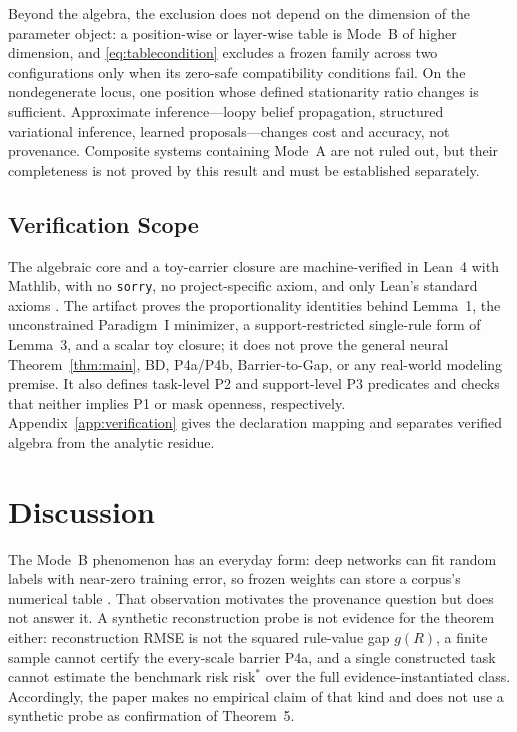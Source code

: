 \documentclass[twoside,11pt]{article}
\begin{document}
Beyond the algebra, the exclusion does not depend on the dimension of the parameter object: a position-wise or layer-wise table is Mode~B of higher dimension, and \eqref{eq:tablecondition} excludes a frozen family across two configurations only when its zero-safe compatibility conditions fail. On the nondegenerate locus, one position whose defined stationarity ratio changes is sufficient. Approximate inference---loopy belief propagation, structured variational inference, learned proposals---changes cost and accuracy, not provenance. Composite systems containing Mode~A are not ruled out, but their completeness is not proved by this result and must be established separately.

\subsection{Verification Scope}
\label{sec:verification}

The algebraic core and a toy-carrier closure are machine-verified in Lean~4 with Mathlib, with no \texttt{sorry}, no project-specific axiom, and only Lean's standard axioms \citep{demoura2021,mathlib2020}. The artifact proves the proportionality identities behind Lemma~1, the unconstrained Paradigm~I minimizer, a support-restricted single-rule form of Lemma~3, and a scalar toy closure; it does not prove the general neural Theorem~\ref{thm:main}, BD, P4a/P4b, Barrier-to-Gap, or any real-world modeling premise. It also defines task-level P2 and support-level P3 predicates and checks that neither implies P1 or mask openness, respectively. Appendix~\ref{app:verification} gives the declaration mapping and separates verified algebra from the analytic residue.

\section{Discussion}
\label{ch:discussion}%

The Mode~B phenomenon has an everyday form: deep networks can fit random labels with near-zero training error, so frozen weights can store a corpus's numerical table \citep{zhang2021}. That observation motivates the provenance question but does not answer it. A synthetic reconstruction probe is not evidence for the theorem either: reconstruction RMSE is not the squared rule-value gap $g(R)$, a finite sample cannot certify the every-scale barrier P4a, and a single constructed task cannot estimate the benchmark risk $\mathrm{risk}^*$ over the full evidence-instantiated class. Accordingly, the paper makes no empirical claim of that kind and does not use a synthetic probe as confirmation of Theorem~5.
\end{document}
